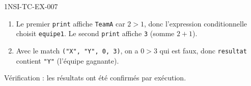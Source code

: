 \begin{corrige}{1NSI-TC-EX-007}
\begin{enumerate}
  \item Le premier \lstinline{print} affiche \lstinline{TeamA} car $2 > 1$, donc l'expression conditionnelle choisit \lstinline{equipe1}. Le second \lstinline{print} affiche \lstinline{3} (somme $2 + 1$).

  \item Avec le match \lstinline{("X", "Y", 0, 3)}, on a $0 > 3$ qui est faux, donc \lstinline{resultat} contient \lstinline{"Y"} (l'équipe gagnante).
\end{enumerate}

Vérification : les résultats ont été confirmés par exécution.
\end{corrige}
